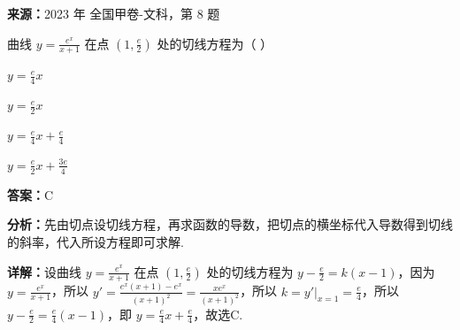 \begin{question}[points=5]
\textbf{来源：}2023 年 全国甲卷-文科，第 8 题\par
曲线 $y = \frac{e^x}{x+1}$ 在点 $\left(1, \frac{e}{2}\right)$ 处的切线方程为（    ）
\begin{choices}
  \item $y = \frac{e}{4}x$
  \item $y = \frac{e}{2}x$
  \item $y = \frac{e}{4}x + \frac{e}{4}$
  \item $y = \frac{e}{2}x + \frac{3e}{4}$
\end{choices}
\begin{solution}
\textbf{答案：}C

\textbf{分析：}先由切点设切线方程，再求函数的导数，把切点的横坐标代入导数得到切线的斜率，代入所设方程即可求解.

\textbf{详解：}设曲线 $y = \frac{e^x}{x+1}$ 在点 $\left(1, \frac{e}{2}\right)$ 处的切线方程为 $y - \frac{e}{2} = k(x-1)$，因为 $y = \frac{e^x}{x+1}$，所以 $y' = \frac{e^x(x+1)-e^x}{(x+1)^2} = \frac{xe^x}{(x+1)^2}$，所以 $k = y'|_{x=1}= \frac{e}{4}$，所以 $y - \frac{e}{2} = \frac{e}{4}(x-1)$，即 $y = \frac{e}{4}x + \frac{e}{4}$，故选C.
\end{solution}
\end{question}

